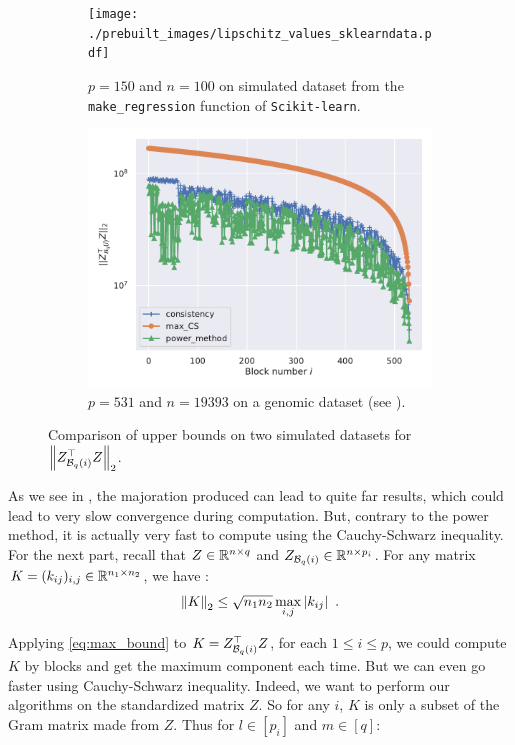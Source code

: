 \documentclass[a4]{article}
\begin{document}
\begin{figure}[t]
	\begin{subfigure}{.45\textwidth}
		\centering
		\texttt{[image: ./prebuilt\_images/lipschitz\_values\_sklearndata.pdf]}
		\caption{$p=150$ and $n=100$ on simulated dataset from the \texttt{make\_regression} function of \texttt{Scikit-learn}.}
	\end{subfigure}
	\begin{subfigure}{.45\textwidth}
		\centering
		\includegraphics[scale = 0.43]{./prebuilt_images/lipschitz_values_genomdata.pdf}
		\caption{$p=531$ and $n=19393$ on a genomic dataset (see ).}
	\end{subfigure}
	\caption{Comparison of upper bounds on two simulated datasets for $\left \lVert Z_{\mathcal{B}_{q}(i)}^\top Z \right \rVert_2$.}
	\label{fig:lip_values}
\end{figure}

As we see in , the majoration produced can lead to quite far results, which could lead to very slow convergence during computation.
But, contrary to the power method, it is actually very fast to compute using the Cauchy-Schwarz inequality.
For the next part, recall that $Z\in\mathbb{R}^{n\times q}$ and $Z_{\mathcal{B}_{q}(i)}\in\mathbb{R}^{n\times p_i}$.
For any matrix $K=(k_{ij})_{i,j}\in\mathbb{R}^{n_1\times n_2}$, we have \citep[p.~27]{vandebril07}:
\begin{align}\label{eq:max_bound}
\left \lVert K \right \rVert_2 \leq \sqrt{n_1n_2}\max_{i,j} |k_{ij}| \enspace.
\end{align}

Applying \eqref{eq:max_bound} to $K=Z_{\mathcal{B}_{q}(i)}^\top Z$, for each $1\leq i\leq p$, we could compute $K$ by blocks and get the maximum component each time.
But we can even go faster using Cauchy-Schwarz inequality. Indeed, we want to perform our algorithms on the standardized matrix $Z$. So for any $i$,
$K$ is only a subset of the Gram matrix made from $Z$. Thus for $l\in[p_i]$ and $m\in[q]$:
\end{document}
